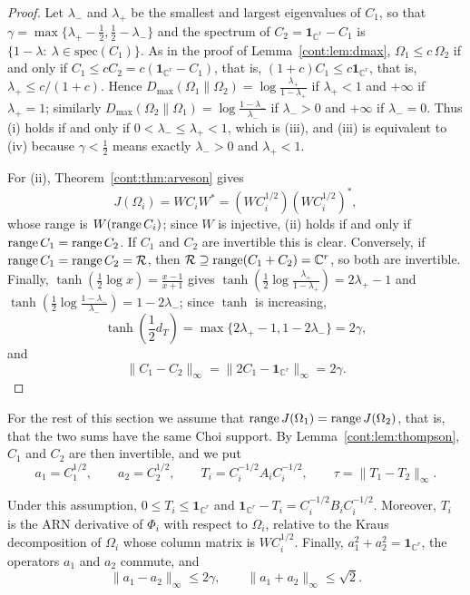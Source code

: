 \begin{proof}
Let $\lambda_-$ and $\lambda_+$ be the smallest and largest eigenvalues of $C_1$, so that $\gamma=\max\{\lambda_+-\frac12,\frac12-\lambda_-\}$ and the spectrum of $C_2=\mathbf{1}_{\mathbb{C}^r}-C_1$ is $\{1-\lambda:\ \lambda\in\mathrm{spec}(C_1)\}$. As in the proof of Lemma~\ref{cont:lem:dmax}, $\Omega_1\leq c\,\Omega_2$ if and only if $C_1\leq cC_2=c(\mathbf{1}_{\mathbb{C}^r}-C_1)$, that is, $(1+c)C_1\leq c\mathbf{1}_{\mathbb{C}^r}$, that is, $\lambda_+\leq c/(1+c)$. Hence $D_{\max}(\Omega_1\|\Omega_2)=\log\frac{\lambda_+}{1-\lambda_+}$ if $\lambda_+<1$ and $+\infty$ if $\lambda_+=1$; similarly $D_{\max}(\Omega_2\|\Omega_1)=\log\frac{1-\lambda_-}{\lambda_-}$ if $\lambda_->0$ and $+\infty$ if $\lambda_-=0$. Thus (i) holds if and only if $0<\lambda_-\leq\lambda_+<1$, which is (iii), and (iii) is equivalent to (iv) because $\gamma<\frac12$ means exactly $\lambda_->0$ and $\lambda_+<1$.

For (ii), Theorem~\ref{cont:thm:arveson} gives
\[
J(\Omega_i)=WC_iW^*=(WC_i^{1/2})(WC_i^{1/2})^*,
\]
whose range is $W(\operatorname{range} C_i)$; since $W$ is injective, (ii) holds if and only if $\operatorname{range} C_1=\operatorname{range} C_2$. If $C_1$ and $C_2$ are invertible this is clear. Conversely, if $\operatorname{range} C_1=\operatorname{range} C_2=\mathcal{R}$, then $\mathcal{R}\supseteq\operatorname{range}(C_1+C_2)=\mathbb{C}^r$, so both are invertible. Finally, $\tanh(\frac12\log x)=\frac{x-1}{x+1}$ gives $\tanh(\frac12\log\frac{\lambda_+}{1-\lambda_+})=2\lambda_+-1$ and $\tanh(\frac12\log\frac{1-\lambda_-}{\lambda_-})=1-2\lambda_-$; since $\tanh$ is increasing,
\[
\tanh(\frac12d_T)=\max\{2\lambda_+-1,1-2\lambda_-\}=2\gamma,
\]
and
\[
\|C_1-C_2\|_\infty=\|2C_1-\mathbf{1}_{\mathbb{C}^r}\|_\infty=2\gamma.
\]
\end{proof}

For the rest of this section we assume that $\operatorname{range} J(\Omega_1)=\operatorname{range} J(\Omega_2)$, that is, that the two sums have the same Choi support. By Lemma~\ref{cont:lem:thompson}, $C_1$ and $C_2$ are then invertible, and we put
\[
a_1=C_1^{1/2},\qquad a_2=C_2^{1/2},\qquad T_i=C_i^{-1/2}A_iC_i^{-1/2},\qquad\tau=\|T_1-T_2\|_\infty .
\]

\begin{lemma}\label{cont:lem:inpair}
Under this assumption, $0\leq T_i\leq\mathbf{1}_{\mathbb{C}^r}$ and $\mathbf{1}_{\mathbb{C}^r}-T_i=C_i^{-1/2}B_iC_i^{-1/2}$. Moreover, $T_i$ is the ARN derivative of $\Phi_i$ with respect to $\Omega_i$, relative to the Kraus decomposition of $\Omega_i$ whose column matrix is $WC_i^{1/2}$. Finally, $a_1^2+a_2^2=\mathbf{1}_{\mathbb{C}^r}$, the operators $a_1$ and $a_2$ commute, and
\[
\|a_1-a_2\|_\infty\leq2\gamma,\qquad\|a_1+a_2\|_\infty\leq\sqrt2 .
\]
\end{lemma}

